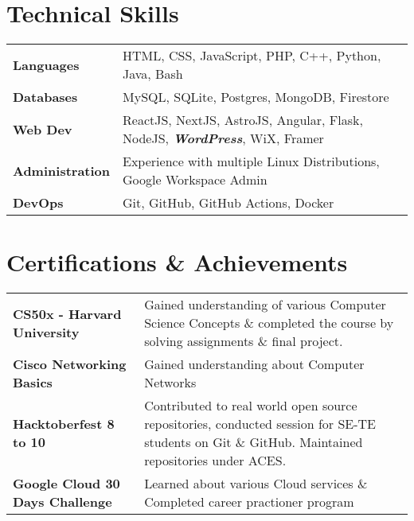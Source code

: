 \documentclass[a4paper,10pt]{article}
\begin{document}
\section{Technical Skills}
\begin{tabularx}{\linewidth}{@{}l X@{}}
\textbf{Languages} &  \normalsize{HTML, CSS, JavaScript, PHP, C++, Python, Java, Bash}\\
\textbf{Databases} &  \normalsize{MySQL, SQLite, Postgres, MongoDB, Firestore}\\
\textbf{Web Dev}  &  \normalsize{ReactJS, NextJS, AstroJS, Angular,  Flask, NodeJS, \textbf{\textit{WordPress}}, WiX, Framer}\\
\textbf{Administration} & \normalsize{Experience with multiple Linux Distributions, Google Workspace Admin}\\
\textbf{DevOps}  &  \normalsize{Git, GitHub, GitHub Actions,  Docker}\\
\end{tabularx}


\section{Certifications \& Achievements}
\begin{tabularx}{\linewidth}{@{}l X@{}}
    \textbf{CS50x - Harvard University} & \normalsize{Gained understanding of various Computer Science Concepts \& completed the course by solving assignments \& final project.}\\
    \textbf{Cisco Networking Basics} &  \normalsize{Gained understanding about Computer Networks}\\
    \textbf{Hacktoberfest 8 to 10}  &  \normalsize{ Contributed to real world open source repositories, conducted session for SE-TE students on Git \& GitHub. Maintained repositories under ACES. }\\
    \textbf{Google Cloud 30 Days Challenge} &  \normalsize{Learned about various Cloud services \& Completed career practioner program}\\
\end{tabularx}

\vspace*{5mm}
\end{document}
